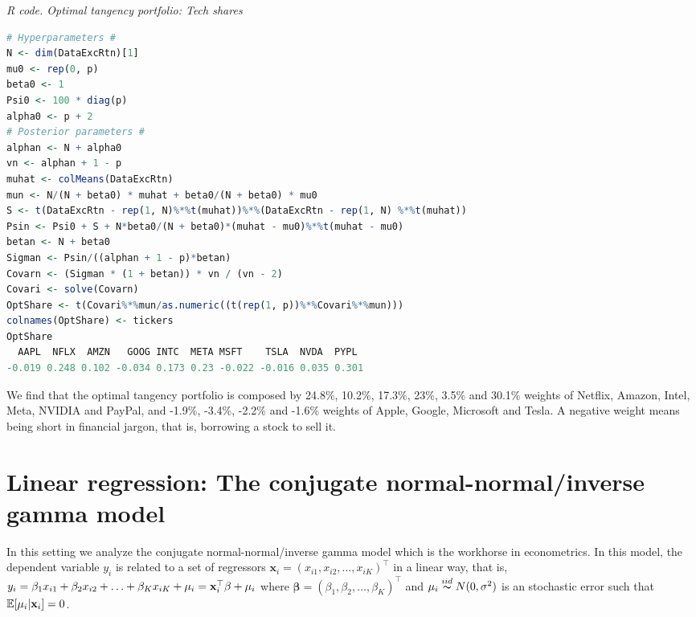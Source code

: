 \begin{enumerate}
\begin{tcolorbox}[enhanced,width=4.67in,center upper,
	fontupper=\large\bfseries,drop shadow southwest,sharp corners]
	\textit{R code. Optimal tangency portfolio: Tech shares}
\begin{VF}
\begin{lstlisting}[language=R]
# Hyperparameters #
N <- dim(DataExcRtn)[1]
mu0 <- rep(0, p)
beta0 <- 1
Psi0 <- 100 * diag(p)
alpha0 <- p + 2
# Posterior parameters #
alphan <- N + alpha0
vn <- alphan + 1 - p
muhat <- colMeans(DataExcRtn)
mun <- N/(N + beta0) * muhat + beta0/(N + beta0) * mu0
S <- t(DataExcRtn - rep(1, N)%*%t(muhat))%*%(DataExcRtn - rep(1, N) %*%t(muhat)) 
Psin <- Psi0 + S + N*beta0/(N + beta0)*(muhat - mu0)%*%t(muhat - mu0)
betan <- N + beta0
Sigman <- Psin/((alphan + 1 - p)*betan)
Covarn <- (Sigman * (1 + betan)) * vn / (vn - 2)
Covari <- solve(Covarn)
OptShare <- t(Covari%*%mun/as.numeric((t(rep(1, p))%*%Covari%*%mun)))
colnames(OptShare) <- tickers
OptShare
  AAPL  NFLX  AMZN   GOOG INTC  META MSFT    TSLA  NVDA  PYPL
-0.019 0.248 0.102 -0.034 0.173 0.23 -0.022 -0.016 0.035 0.301
\end{lstlisting}
\end{VF}
\end{tcolorbox}

We find that the optimal tangency portfolio is composed by 24.8\%, 10.2\%, 17.3\%, 23\%, 3.5\% and 30.1\% weights of Netflix, Amazon, Intel, Meta, NVIDIA and PayPal, and -1.9\%, -3.4\%, -2.2\% and -1.6\% weights of Apple, Google, Microsoft and Tesla. A negative weight means being short in financial jargon, that is, borrowing a stock to sell it.
\end{enumerate}


\section{Linear regression: The conjugate normal-normal/inverse gamma model}\label{sec43}

In this setting we analyze the conjugate normal-normal/inverse gamma model which is the workhorse in econometrics. In this model, the dependent variable $y_i$ is related to a set of regressors ${\mathbf{x}}_i=(x_{i1},x_{i2},\ldots,x_{iK})^{\top}$ in a linear way, that is, $y_i=\beta_1x_{i1}+\beta_2x_{i2}+\ldots+\beta_Kx_{iK}+\mu_i={\bf{x}}_i^{\top}\beta+\mu_i$ where $\bm{\beta}=(\beta_1,\beta_2,\ldots,\beta_K)^{\top}$ and $\mu_i\stackrel{iid} {\thicksim}N(0,\sigma^2)$ is an stochastic error such that $\mathbb{E}[\mu_i|{\bf{x}}_i]=0$.

